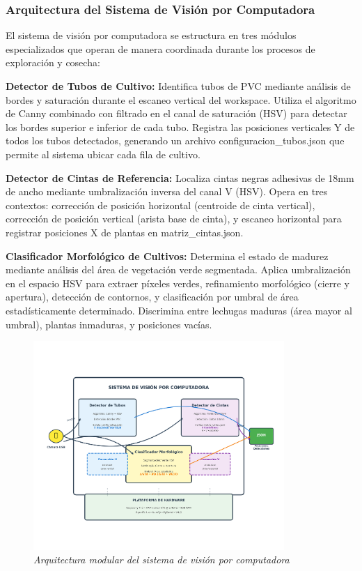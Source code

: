 \subsubsection{Arquitectura del Sistema de Visión por Computadora}

El sistema de visión por computadora se estructura en tres módulos especializados que operan de manera coordinada durante los procesos de exploración y cosecha:

\textbf{Detector de Tubos de Cultivo:} Identifica tubos de PVC mediante análisis de bordes y saturación durante el escaneo vertical del workspace. Utiliza el algoritmo de Canny combinado con filtrado en el canal de saturación (HSV) para detectar los bordes superior e inferior de cada tubo. Registra las posiciones verticales Y de todos los tubos detectados, generando un archivo configuracion\_tubos.json que permite al sistema ubicar cada fila de cultivo.

\textbf{Detector de Cintas de Referencia:} Localiza cintas negras adhesivas de 18mm de ancho mediante umbralización inversa del canal V (HSV). Opera en tres contextos: corrección de posición horizontal (centroide de cinta vertical), corrección de posición vertical (arista base de cinta), y escaneo horizontal para registrar posiciones X de plantas en matriz\_cintas.json.

\textbf{Clasificador Morfológico de Cultivos:} Determina el estado de madurez mediante análisis del área de vegetación verde segmentada. Aplica umbralización en el espacio HSV para extraer píxeles verdes, refinamiento morfológico (cierre y apertura), detección de contornos, y clasificación por umbral de área estadísticamente determinado. Discrimina entre lechugas maduras (área mayor al umbral), plantas inmaduras, y posiciones vacías.

\begin{figure}[h]
\centering
\includegraphics[width=0.85\textwidth]{imagenes/arquitectura_modular_vision.png}
\caption{\textit{Arquitectura modular del sistema de visión por computadora}}
\label{fig:arquitectura_modular}
\end{figure}

